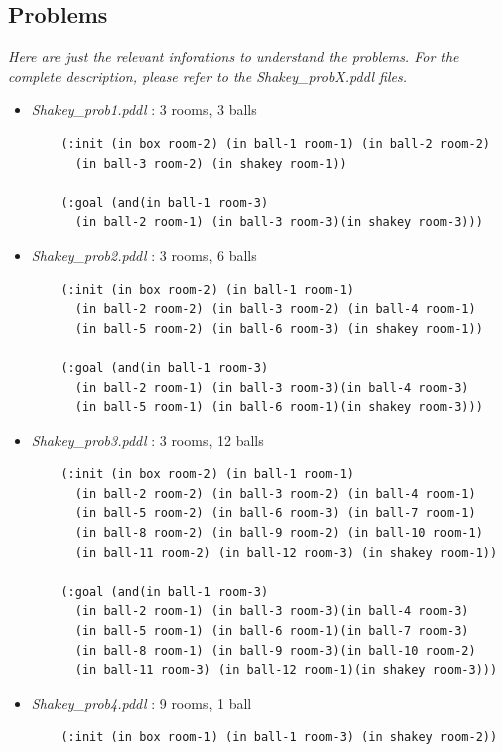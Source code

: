 \thispagestyle{empty}
\subsection*{Problems}

\textit{Here are just the relevant inforations to understand the problems.
For the complete description, please refer to the Shakey\_probX.pddl files.}
\begin{itemize}
  \item \textit{Shakey\_prob1.pddl} : 3 rooms, 3 balls
  \vspace*{1em}
  \begin{verbatim}
    (:init (in box room-2) (in ball-1 room-1) (in ball-2 room-2)
      (in ball-3 room-2) (in shakey room-1))

    (:goal (and(in ball-1 room-3)
      (in ball-2 room-1) (in ball-3 room-3)(in shakey room-3)))
  \end{verbatim}
  \item \textit{Shakey\_prob2.pddl} : 3 rooms, 6 balls
  \vspace*{1em}
  \begin{verbatim}
    (:init (in box room-2) (in ball-1 room-1)
      (in ball-2 room-2) (in ball-3 room-2) (in ball-4 room-1)
      (in ball-5 room-2) (in ball-6 room-3) (in shakey room-1))

    (:goal (and(in ball-1 room-3)
      (in ball-2 room-1) (in ball-3 room-3)(in ball-4 room-3)
      (in ball-5 room-1) (in ball-6 room-1)(in shakey room-3)))
  \end{verbatim}
  \thispagestyle{empty}
  \item \textit{Shakey\_prob3.pddl} : 3 rooms, 12 balls
  \vspace*{1em}
  \begin{verbatim}
    (:init (in box room-2) (in ball-1 room-1)
      (in ball-2 room-2) (in ball-3 room-2) (in ball-4 room-1)
      (in ball-5 room-2) (in ball-6 room-3) (in ball-7 room-1)
      (in ball-8 room-2) (in ball-9 room-2) (in ball-10 room-1)
      (in ball-11 room-2) (in ball-12 room-3) (in shakey room-1))

    (:goal (and(in ball-1 room-3)
      (in ball-2 room-1) (in ball-3 room-3)(in ball-4 room-3)
      (in ball-5 room-1) (in ball-6 room-1)(in ball-7 room-3)
      (in ball-8 room-1) (in ball-9 room-3)(in ball-10 room-2)
      (in ball-11 room-3) (in ball-12 room-1)(in shakey room-3)))
  \end{verbatim}
  \item \textit{Shakey\_prob4.pddl} : 9 rooms, 1 ball
  \vspace*{1em}
  \begin{verbatim}
    (:init (in box room-1) (in ball-1 room-3) (in shakey room-2))


\end{verbatim}
\end{itemize}
